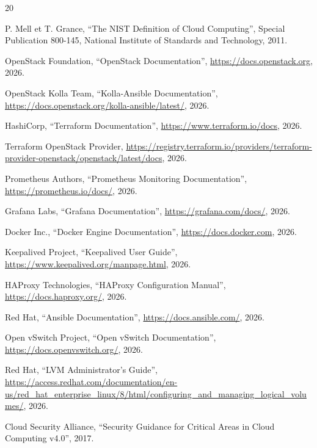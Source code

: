 \documentclass[12pt,a4paper,oneside]{book}
\begin{document}
\begin{thebibliography}{20}

 P. Mell et T. Grance, ``The NIST Definition of Cloud Computing'', Special Publication 800-145, National Institute of Standards and Technology, 2011.

 OpenStack Foundation, ``OpenStack Documentation'', \url{https://docs.openstack.org}, 2026.

 OpenStack Kolla Team, ``Kolla-Ansible Documentation'', \url{https://docs.openstack.org/kolla-ansible/latest/}, 2026.

 HashiCorp, ``Terraform Documentation'', \url{https://www.terraform.io/docs}, 2026.

 Terraform OpenStack Provider, \url{https://registry.terraform.io/providers/terraform-provider-openstack/openstack/latest/docs}, 2026.

 Prometheus Authors, ``Prometheus Monitoring Documentation'', \url{https://prometheus.io/docs/}, 2026.

 Grafana Labs, ``Grafana Documentation'', \url{https://grafana.com/docs/}, 2026.

 Docker Inc., ``Docker Engine Documentation'', \url{https://docs.docker.com}, 2026.

 Keepalived Project, ``Keepalived User Guide'', \url{https://www.keepalived.org/manpage.html}, 2026.

 HAProxy Technologies, ``HAProxy Configuration Manual'', \url{https://docs.haproxy.org/}, 2026.

 Red Hat, ``Ansible Documentation'', \url{https://docs.ansible.com/}, 2026.

 Open vSwitch Project, ``Open vSwitch Documentation'', \url{https://docs.openvswitch.org/}, 2026.

 Red Hat, ``LVM Administrator's Guide'', \url{https://access.redhat.com/documentation/en-us/red_hat_enterprise_linux/8/html/configuring_and_managing_logical_volumes/}, 2026.

 Cloud Security Alliance, ``Security Guidance for Critical Areas in Cloud Computing v4.0'', 2017.

\end{thebibliography}
\end{document}
